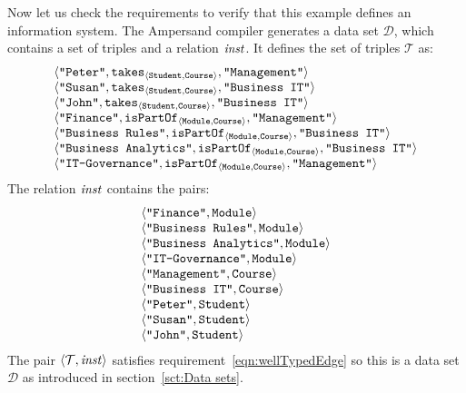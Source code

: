 \documentclass[runningheads]{llncs}
\newcommand{\id}[1]{\text{\it #1\/}}
\newcommand{\instance}{\mathbin{\id{inst}}}
\newcommand{\declare}[3]{\id{#1}_{\pair{#2}{#3}}}
\newcommand{\pair}[2]{\langle{#1},{#2}\rangle}
\newcommand{\triple}[3]{\langle{#1},{#2},{#3}\rangle}
\newcommand{\triples}{\mathcal{T}}
\newcommand{\dataset}{\mathscr{D}}
\begin{document}
   Now let us check the requirements to verify that this example defines an information system.
   The Ampersand compiler generates a data set $\dataset$, which contains a set of triples and a relation $\instance$.
   It defines the set of triples $\triples$ as:
\[\begin{array}[t]{l}
   \triple{\text{\tt "Peter"}}{\declare{\text{\tt takes}}{\text{\tt Student}}{\text{\tt Course}}}{\text{\tt "Management"}}\\
   \triple{\text{\tt "Susan"}}{\declare{\text{\tt takes}}{\text{\tt Student}}{\text{\tt Course}}}{\text{\tt "Business IT"}}\\
   \triple{\text{\tt "John"}}{\declare{\text{\tt takes}}{\text{\tt Student}}{\text{\tt Course}}}{\text{\tt "Business IT"}}\\
   \triple{\text{\tt "Finance"}}{\declare{\text{\tt isPartOf}}{\text{\tt Module}}{\text{\tt Course}}}{\text{\tt "Management"}}\\
   \triple{\text{\tt "Business Rules"}}{\declare{\text{\tt isPartOf}}{\text{\tt Module}}{\text{\tt Course}}}{\text{\tt "Business IT"}}\\
   \triple{\text{\tt "Business Analytics"}}{\declare{\text{\tt isPartOf}}{\text{\tt Module}}{\text{\tt Course}}}{\text{\tt "Business IT"}}\\
   \triple{\text{\tt "IT-Governance"}}{\declare{\text{\tt isPartOf}}{\text{\tt Module}}{\text{\tt Course}}}{\text{\tt "Management"}}
\end{array}\]
The relation $\instance$ contains the pairs:
\[\begin{array}{l}
   \pair{\text{\tt "Finance"}}{\tt Module}\\
   \pair{\text{\tt "Business Rules"}}{\tt Module}\\
   \pair{\text{\tt "Business Analytics"}}{\tt Module}\\
   \pair{\text{\tt "IT-Governance"}}{\tt Module}\\
   \pair{\text{\tt "Management"}}{\tt Course}\\
   \pair{\text{\tt "Business IT"}}{\tt Course}\\
   \pair{\text{\tt "Peter"}}{\tt Student}\\
   \pair{\text{\tt "Susan"}}{\tt Student}\\
   \pair{\text{\tt "John"}}{\tt Student}
\end{array}\]
   The pair $\pair{\triples}{\instance}$ satisfies requirement~\ref{eqn:wellTypedEdge} so this is a data set $\dataset$ as introduced in section~\ref{sct:Data sets}.
\end{document}
